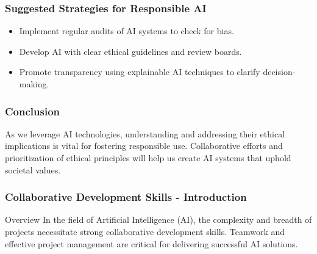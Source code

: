 \documentclass[aspectratio=169]{beamer}
\begin{document}
\begin{frame}[fragile]
    \frametitle{Suggested Strategies for Responsible AI}
    \begin{itemize}
        \item Implement regular audits of AI systems to check for bias.
        \item Develop AI with clear ethical guidelines and review boards.
        \item Promote transparency using explainable AI techniques to clarify decision-making.
    \end{itemize}
\end{frame}

\begin{frame}[fragile]
    \frametitle{Conclusion}
    As we leverage AI technologies, understanding and addressing their ethical implications is vital for fostering responsible use. Collaborative efforts and prioritization of ethical principles will help us create AI systems that uphold societal values.
\end{frame}

\begin{frame}[fragile]
    \frametitle{Collaborative Development Skills - Introduction}
    \begin{block}{Overview}
        In the field of Artificial Intelligence (AI), the complexity and breadth of projects necessitate strong collaborative development skills. Teamwork and effective project management are critical for delivering successful AI solutions. 
    \end{block}
\end{frame}
\end{document}
